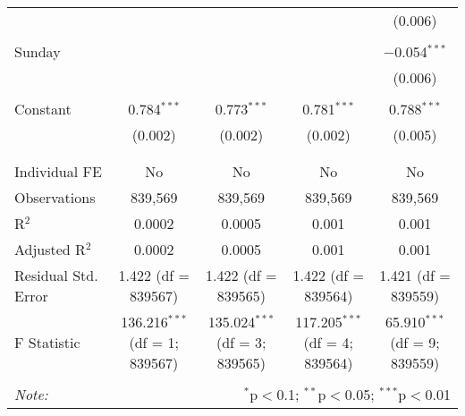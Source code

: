 \documentclass[
]{article}
\begin{document}
\begin{table}[!htbp]
{\begin{tabular}{@{\extracolsep{5pt}}lcccc}
  &  &  &  & (0.006) \\ 
  & & & & \\ 
 Sunday &  &  &  & $-$0.054$^{***}$ \\ 
  &  &  &  & (0.006) \\ 
  & & & & \\ 
 Constant & 0.784$^{***}$ & 0.773$^{***}$ & 0.781$^{***}$ & 0.788$^{***}$ \\ 
  & (0.002) & (0.002) & (0.002) & (0.005) \\ 
  & & & & \\ 
\hline \\[-1.8ex] 
Individual FE & No & No & No & No \\ 
Observations & 839,569 & 839,569 & 839,569 & 839,569 \\ 
R$^{2}$ & 0.0002 & 0.0005 & 0.001 & 0.001 \\ 
Adjusted R$^{2}$ & 0.0002 & 0.0005 & 0.001 & 0.001 \\ 
Residual Std. Error & 1.422 (df = 839567) & 1.422 (df = 839565) & 1.422 (df = 839564) & 1.421 (df = 839559) \\ 
F Statistic & 136.216$^{***}$ (df = 1; 839567) & 135.024$^{***}$ (df = 3; 839565) & 117.205$^{***}$ (df = 4; 839564) & 65.910$^{***}$ (df = 9; 839559) \\ 
\hline 
\hline \\[-1.8ex] 
\textit{Note:}  & \multicolumn{4}{r}{$^{*}$p$<$0.1; $^{**}$p$<$0.05; $^{***}$p$<$0.01} \\ 
\end{tabular}
} 
\end{table} 
\newpage
\end{document}
